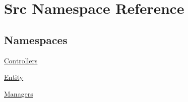 \hypertarget{namespace_src}{}\section{Src Namespace Reference}
\label{namespace_src}
\subsection*{Namespaces}
\begin{DoxyCompactItemize}
\item 
 \hyperlink{namespace_src_1_1_controllers}{Controllers}
\item 
 \hyperlink{namespace_src_1_1_entity}{Entity}
\item 
 \hyperlink{namespace_src_1_1_managers}{Managers}
\end{DoxyCompactItemize}
